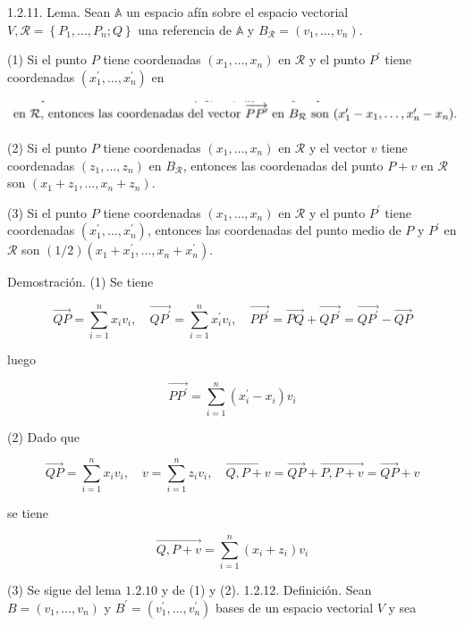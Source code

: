 \documentclass[12pt, a4paper, ones, notitlepage, openany,titlepage]{article}
\begin{document}
1.2.11. Lema. Sean $\mathbb{A}$ un espacio afín sobre el espacio vectorial $V, \mathcal{R}=\left\{P_{1}, \ldots, P_{n} ; Q\right\}$ una referencia de $\mathbb{A}$ y $B_{\mathcal{R}}=\left(v_{1}, \ldots, v_{n}\right)$.

(1) Si el punto $P$ tiene coordenadas $\left(x_{1}, \ldots, x_{n}\right)$ en $\mathcal{R}$ y el punto $P^{\prime}$ tiene coordenadas $\left(x_{1}^{\prime}, \ldots, x_{n}^{\prime}\right)$ en 

\begin{center}
\includegraphics[max width=\textwidth]{2023_03_01_7659aec5e35f9a9b2d3cg-13}
\end{center}

(2) Si el punto $P$ tiene coordenadas $\left(x_{1}, \ldots, x_{n}\right)$ en $\mathcal{R}$ y el vector $v$ tiene coordenadas $\left(z_{1}, \ldots, z_{n}\right)$ en $B_{\mathcal{R}}$, entonces las coordenadas del punto $P+v$ en $\mathcal{R}$ son $\left(x_{1}+z_{1}, \ldots, x_{n}+z_{n}\right)$.

(3) Si el punto $P$ tiene coordenadas $\left(x_{1}, \ldots, x_{n}\right)$ en $\mathcal{R}$ y el punto $P^{\prime}$ tiene coordenadas $\left(x_{1}^{\prime}, \ldots, x_{n}^{\prime}\right)$, entonces las coordenadas del punto medio de $P$ y $P^{\prime}$ en $\mathcal{R}$ son $(1 / 2)\left(x_{1}+x_{1}^{\prime}, \ldots, x_{n}+x_{n}^{\prime}\right)$.

Demostración. (1) Se tiene

$$
\overrightarrow{Q P}=\sum_{i=1}^{n} x_{i} v_{i}, \quad \overrightarrow{Q P^{\prime}}=\sum_{i=1}^{n} x_{i}^{\prime} v_{i}, \quad \overrightarrow{P P^{\prime}}=\overrightarrow{P Q}+\overrightarrow{Q P^{\prime}}=\overrightarrow{Q P^{\prime}}-\overrightarrow{Q P}
$$

luego

$$
\overrightarrow{P P^{\prime}}=\sum_{i=1}^{n}\left(x_{i}^{\prime}-x_{i}\right) v_{i}
$$

(2) Dado que

$$
\overrightarrow{Q P}=\sum_{i=1}^{n} x_{i} v_{i}, \quad v=\sum_{i=1}^{n} z_{i} v_{i}, \quad \overrightarrow{Q, P+v}=\overrightarrow{Q P}+\overrightarrow{P, P+v}=\overrightarrow{Q P}+v
$$

se tiene

$$
\overrightarrow{Q, P+v}=\sum_{i=1}^{n}\left(x_{i}+z_{i}\right) v_{i}
$$

(3) Se sigue del lema $1.2 .10$ y de (1) y (2). 1.2.12. Definición. Sean $B=\left(v_{1}, \ldots, v_{n}\right)$ y $B^{\prime}=\left(v_{1}^{\prime}, \ldots, v_{n}^{\prime}\right)$ bases de un espacio vectorial $V$ y sea
\end{document}
